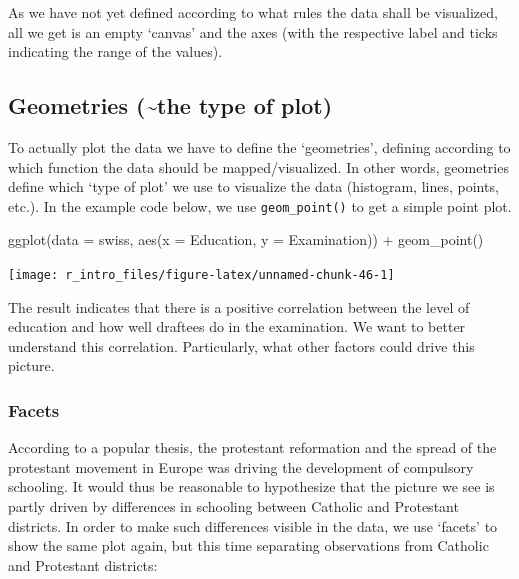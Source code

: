 \documentclass[
  12pt,
]{style/krantz}
\newenvironment{Shaded}{\begin{snugshade}}{\end{snugshade}}
\newcommand{\AttributeTok}[1]{\textcolor[rgb]{0.77,0.63,0.00}{#1}}
\newcommand{\FunctionTok}[1]{\textcolor[rgb]{0.00,0.00,0.00}{#1}}
\newcommand{\NormalTok}[1]{#1}
\newcommand{\SpecialCharTok}[1]{\textcolor[rgb]{0.00,0.00,0.00}{#1}}
\begin{document}
As we have not yet defined according to what rules the data shall be visualized, all we get is an empty `canvas' and the axes (with the respective label and ticks indicating the range of the values).

\hypertarget{geometries-the-type-of-plot}{%
\subsection{Geometries (\textasciitilde the type of plot)}\label{geometries-the-type-of-plot}}

To actually plot the data we have to define the `geometries', defining according to which function the data should be mapped/visualized. In other words, geometries define which `type of plot' we use to visualize the data (histogram, lines, points, etc.). In the example code below, we use \texttt{geom\_point()} to get a simple point plot.

\begin{Shaded}
\begin{Highlighting}[]
\FunctionTok{ggplot}\NormalTok{(}\AttributeTok{data =}\NormalTok{ swiss, }\FunctionTok{aes}\NormalTok{(}\AttributeTok{x =}\NormalTok{ Education, }\AttributeTok{y =}\NormalTok{ Examination)) }\SpecialCharTok{+} 
     \FunctionTok{geom\_point}\NormalTok{()}
\end{Highlighting}
\end{Shaded}

\texttt{[image: r\_intro\_files/figure-latex/unnamed-chunk-46-1]}

The result indicates that there is a positive correlation between the level of education and how well draftees do in the examination. We want to better understand this correlation. Particularly, what other factors could drive this picture.

\hypertarget{facets}{%
\subsubsection{Facets}\label{facets}}

According to a popular thesis, the protestant reformation and the spread of the protestant movement in Europe was driving the development of compulsory schooling. It would thus be reasonable to hypothesize that the picture we see is partly driven by differences in schooling between Catholic and Protestant districts. In order to make such differences visible in the data, we use `facets' to show the same plot again, but this time separating observations from Catholic and Protestant districts:
\end{document}
